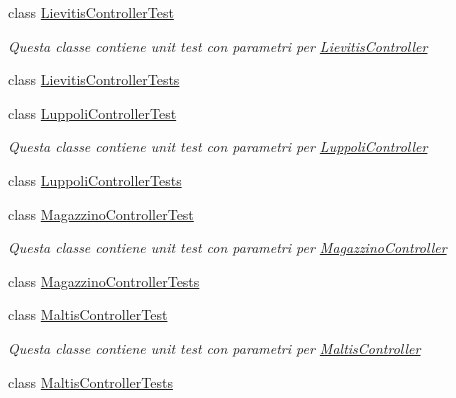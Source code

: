 \begin{DoxyCompactItemize}
\item 
class \mbox{\hyperlink{class_brew_day2_1_1_controllers_1_1_tests_1_1_lievitis_controller_test}{Lievitis\+Controller\+Test}}
\begin{DoxyCompactList}\small\item\em Questa classe contiene unit test con parametri per \mbox{\hyperlink{class_brew_day2_1_1_controllers_1_1_lievitis_controller}{Lievitis\+Controller}}\end{DoxyCompactList}\item 
class \mbox{\hyperlink{class_brew_day2_1_1_controllers_1_1_tests_1_1_lievitis_controller_tests}{Lievitis\+Controller\+Tests}}
\item 
class \mbox{\hyperlink{class_brew_day2_1_1_controllers_1_1_tests_1_1_luppoli_controller_test}{Luppoli\+Controller\+Test}}
\begin{DoxyCompactList}\small\item\em Questa classe contiene unit test con parametri per \mbox{\hyperlink{class_brew_day2_1_1_controllers_1_1_luppoli_controller}{Luppoli\+Controller}}\end{DoxyCompactList}\item 
class \mbox{\hyperlink{class_brew_day2_1_1_controllers_1_1_tests_1_1_luppoli_controller_tests}{Luppoli\+Controller\+Tests}}
\item 
class \mbox{\hyperlink{class_brew_day2_1_1_controllers_1_1_tests_1_1_magazzino_controller_test}{Magazzino\+Controller\+Test}}
\begin{DoxyCompactList}\small\item\em Questa classe contiene unit test con parametri per \mbox{\hyperlink{class_brew_day2_1_1_controllers_1_1_magazzino_controller}{Magazzino\+Controller}}\end{DoxyCompactList}\item 
class \mbox{\hyperlink{class_brew_day2_1_1_controllers_1_1_tests_1_1_magazzino_controller_tests}{Magazzino\+Controller\+Tests}}
\item 
class \mbox{\hyperlink{class_brew_day2_1_1_controllers_1_1_tests_1_1_maltis_controller_test}{Maltis\+Controller\+Test}}
\begin{DoxyCompactList}\small\item\em Questa classe contiene unit test con parametri per \mbox{\hyperlink{class_brew_day2_1_1_controllers_1_1_maltis_controller}{Maltis\+Controller}}\end{DoxyCompactList}\item 
class \mbox{\hyperlink{class_brew_day2_1_1_controllers_1_1_tests_1_1_maltis_controller_tests}{Maltis\+Controller\+Tests}}

\end{DoxyCompactItemize}
